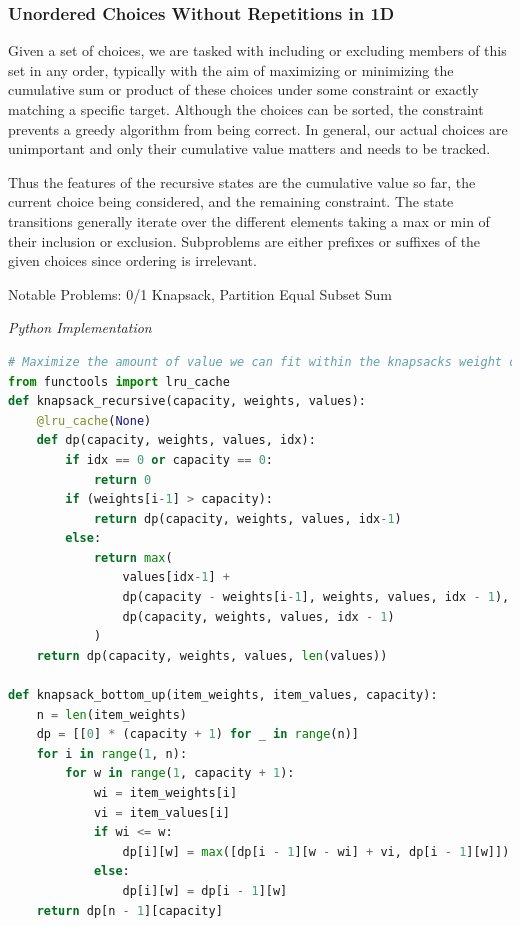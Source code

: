 \documentclass{article}
\newcommand{\comment}[1]{}
\begin{document}
\subsubsection*{Unordered Choices Without Repetitions in 1D}

\comment{
Input: choice array can be reordered, constraint 

dimension doesn't matter much

though a greedy heuristic may improve the time taken for an exhaustive search to find an optimal solution in which case we would want to sort our choices in descending order

Given a knapsack with a maximum weight capacity and a list of items with value and weights, maximize the amount of value we can fit within the knapsacks weight capacity.

TC: O(N*M), SC: O(N)
}

Given a set of choices, we are tasked with including or excluding members of this set in any order, typically with the aim of maximizing or minimizing the cumulative sum or product of these choices under some constraint or exactly matching a specific target. Although the choices can be sorted, the constraint prevents a greedy algorithm from being correct. In general, our actual choices are unimportant and only their cumulative value matters and needs to be tracked. 

Thus the features of the recursive states are the cumulative value so far, the current choice being considered, and the remaining constraint. The state transitions generally iterate over the different elements taking a max or min of their inclusion or exclusion. Subproblems are either prefixes or suffixes of the given choices since ordering is irrelevant. 

Notable Problems: 0/1 Knapsack, Partition Equal Subset Sum

\vspace{8pt} \emph{Python Implementation}
\begin{lstlisting}[language=Python]
# Maximize the amount of value we can fit within the knapsacks weight capacity
from functools import lru_cache
def knapsack_recursive(capacity, weights, values):
    @lru_cache(None)
    def dp(capacity, weights, values, idx):
        if idx == 0 or capacity == 0:
            return 0
        if (weights[i-1] > capacity):
            return dp(capacity, weights, values, idx-1)
        else:
            return max(
                values[idx-1] +
                dp(capacity - weights[i-1], weights, values, idx - 1),
                dp(capacity, weights, values, idx - 1)
            )
    return dp(capacity, weights, values, len(values))

def knapsack_bottom_up(item_weights, item_values, capacity):
    n = len(item_weights)
    dp = [[0] * (capacity + 1) for _ in range(n)]
    for i in range(1, n):
        for w in range(1, capacity + 1):
            wi = item_weights[i]
            vi = item_values[i]
            if wi <= w:
                dp[i][w] = max([dp[i - 1][w - wi] + vi, dp[i - 1][w]])
            else:
                dp[i][w] = dp[i - 1][w]
    return dp[n - 1][capacity]
\end{lstlisting}
\end{document}
